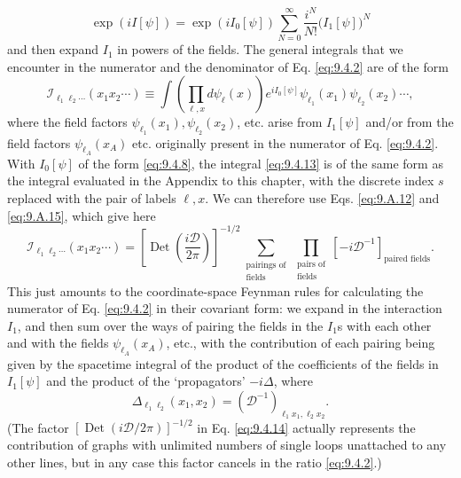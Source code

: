 \begin{equation}
\exp(iI[\psi])=\exp(iI_0[\psi])
 \sum_{N=0}^{\infty}\frac{i^N}{N!}\bigl(I_1[\psi]\bigr)^N
\tag{9.4.12}\label{eq:9.4.12}
\end{equation}
and then expand $I_1$ in powers of the fields. The general integrals that we
encounter in the numerator and the denominator of Eq. \eqref{eq:9.4.2} are of the form
\begin{equation}
\mathcal I_{\ell_1\ell_2\cdots}(x_1x_2\cdots)
\equiv\int\left(\prod_{\ell,x}d\psi_\ell(x)\right)e^{iI_0[\psi]}
 \psi_{\ell_1}(x_1)\psi_{\ell_2}(x_2)\cdots,
\tag{9.4.13}\label{eq:9.4.13}
\end{equation}
where the field factors $\psi_{\ell_1}(x_1),\psi_{\ell_2}(x_2)$, etc. arise
from $I_1[\psi]$ and/or from the field factors $\psi_{\ell_A}(x_A)$ etc.
originally present in the numerator of Eq. \eqref{eq:9.4.2}. With $I_0[\psi]$ of the
form \eqref{eq:9.4.8}, the integral \eqref{eq:9.4.13} is of the same form as the integral
evaluated in the Appendix to this chapter, with the discrete index $s$
replaced with the pair of labels $\ell,x$. We can therefore use Eqs. \eqref{eq:9.A.12}
and \eqref{eq:9.A.15}, which give here
\begin{equation}
\mathcal I_{\ell_1\ell_2\cdots}(x_1x_2\cdots)
=\left[\operatorname{Det}\left(\frac{i\mathcal D}{2\pi}\right)\right]^{-1/2}
 \sum_{\substack{\text{pairings of}\\\text{fields}}}
 \prod_{\substack{\text{pairs of}\\\text{fields}}}
 [-i\mathcal D^{-1}]_{\text{paired fields}}.
\tag{9.4.14}\label{eq:9.4.14}
\end{equation}
This just amounts to the coordinate-space Feynman rules for calculating the
numerator of Eq. \eqref{eq:9.4.2} in their covariant form: we expand in the interaction
$I_1$, and then sum over the ways of pairing the fields in the $I_1$s with each
other and with the fields $\psi_{\ell_A}(x_A)$, etc., with the contribution of
each pairing being given by the spacetime integral of the product of the
coefficients of the fields in $I_1[\psi]$ and the product of the `propagators'
$-i\Delta$, where
\begin{equation}
\Delta_{\ell_1\ell_2}(x_1,x_2)
=(\mathcal D^{-1})_{\ell_1x_1,\ell_2x_2}.
\tag{9.4.15}\label{eq:9.4.15}
\end{equation}
(The factor $[\operatorname{Det}(i\mathcal D/2\pi)]^{-1/2}$ in Eq. \eqref{eq:9.4.14}
actually represents the contribution of graphs with unlimited numbers of
single loops unattached to any other lines, but in any case this factor
cancels in the ratio \eqref{eq:9.4.2}.)

